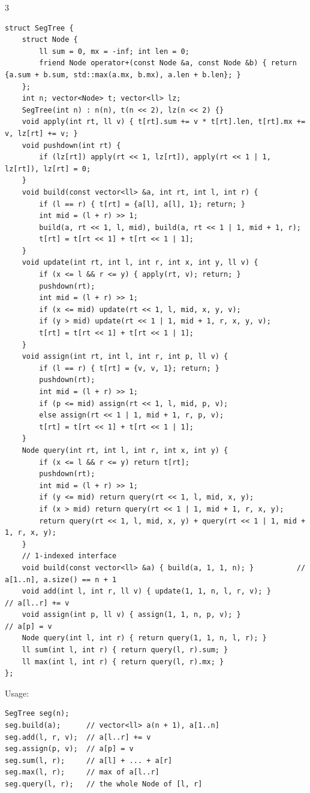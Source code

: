 \documentclass[8pt]{extarticle}
\begin{document}
\begin{multicols*}{3}
\begin{lstlisting}
struct SegTree {
    struct Node {
        ll sum = 0, mx = -inf; int len = 0;
        friend Node operator+(const Node &a, const Node &b) { return {a.sum + b.sum, std::max(a.mx, b.mx), a.len + b.len}; }
    };
    int n; vector<Node> t; vector<ll> lz;
    SegTree(int n) : n(n), t(n << 2), lz(n << 2) {}
    void apply(int rt, ll v) { t[rt].sum += v * t[rt].len, t[rt].mx += v, lz[rt] += v; }
    void pushdown(int rt) {
        if (lz[rt]) apply(rt << 1, lz[rt]), apply(rt << 1 | 1, lz[rt]), lz[rt] = 0;
    }
    void build(const vector<ll> &a, int rt, int l, int r) {
        if (l == r) { t[rt] = {a[l], a[l], 1}; return; }
        int mid = (l + r) >> 1;
        build(a, rt << 1, l, mid), build(a, rt << 1 | 1, mid + 1, r);
        t[rt] = t[rt << 1] + t[rt << 1 | 1];
    }
    void update(int rt, int l, int r, int x, int y, ll v) {
        if (x <= l && r <= y) { apply(rt, v); return; }
        pushdown(rt);
        int mid = (l + r) >> 1;
        if (x <= mid) update(rt << 1, l, mid, x, y, v);
        if (y > mid) update(rt << 1 | 1, mid + 1, r, x, y, v);
        t[rt] = t[rt << 1] + t[rt << 1 | 1];
    }
    void assign(int rt, int l, int r, int p, ll v) {
        if (l == r) { t[rt] = {v, v, 1}; return; }
        pushdown(rt);
        int mid = (l + r) >> 1;
        if (p <= mid) assign(rt << 1, l, mid, p, v);
        else assign(rt << 1 | 1, mid + 1, r, p, v);
        t[rt] = t[rt << 1] + t[rt << 1 | 1];
    }
    Node query(int rt, int l, int r, int x, int y) {
        if (x <= l && r <= y) return t[rt];
        pushdown(rt);
        int mid = (l + r) >> 1;
        if (y <= mid) return query(rt << 1, l, mid, x, y);
        if (x > mid) return query(rt << 1 | 1, mid + 1, r, x, y);
        return query(rt << 1, l, mid, x, y) + query(rt << 1 | 1, mid + 1, r, x, y);
    }
    // 1-indexed interface
    void build(const vector<ll> &a) { build(a, 1, 1, n); }          // a[1..n], a.size() == n + 1
    void add(int l, int r, ll v) { update(1, 1, n, l, r, v); }       // a[l..r] += v
    void assign(int p, ll v) { assign(1, 1, n, p, v); }              // a[p] = v
    Node query(int l, int r) { return query(1, 1, n, l, r); }
    ll sum(int l, int r) { return query(l, r).sum; }
    ll max(int l, int r) { return query(l, r).mx; }
};
\end{lstlisting}

Usage:

\begin{lstlisting}
SegTree seg(n);
seg.build(a);      // vector<ll> a(n + 1), a[1..n]
seg.add(l, r, v);  // a[l..r] += v
seg.assign(p, v);  // a[p] = v
seg.sum(l, r);     // a[l] + ... + a[r]
seg.max(l, r);     // max of a[l..r]
seg.query(l, r);   // the whole Node of [l, r]
\end{lstlisting}


\end{multicols*}
\end{document}
